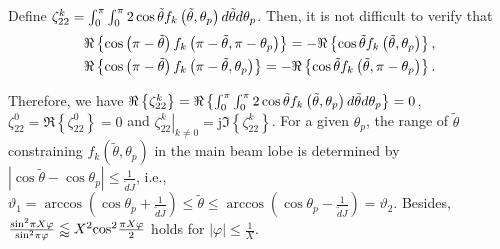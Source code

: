 \documentclass[12pt, draftclsnofoot, onecolumn]{IEEEtran}
\begin{document}
Define $\zeta _{22}^{k}=\int_{0}^{ \rm{\pi} }{\int_{0}^{ \rm{\pi} }{2\cos \tilde{\theta }{f_k}\left( \tilde{\theta },{{\theta }_{p}} \right)d\tilde{\theta }}d{{\theta }_{p}}}$. Then, it is not difficult to verify that
\begin{align}
  & \Re \left\{ \cos \left( { \rm{\pi} }-\tilde{\theta } \right){f_k}\left( { \rm{\pi} }-\tilde{\theta },{ \rm{\pi} }-{{\theta }_{p}} \right) \right\}=-\Re \left\{ \cos \tilde{\theta }{f_k}\left( \tilde{\theta },{{\theta }_{p}} \right) \right\}, \nonumber \\
 & \Re \left\{ \cos \left( { \rm{\pi} }-\tilde{\theta } \right){f_k}\left( { \rm{\pi} }-\tilde{\theta },{{\theta }_{p}} \right) \right\}=-\Re \left\{ \cos \tilde{\theta }{f_k}\left( \tilde{\theta },{ \rm{\pi} } -{{\theta }_{p}} \right) \right\}.
\end{align}

Therefore, we have $\Re \left\{ \zeta _{22}^{k} \right\}=\Re \left\{ \int_{0}^{ \rm{\pi} }{\int_{0}^{ \rm{\pi} }{2\cos \tilde{\theta }{f_k}\left( \tilde{\theta },{{\theta }_{p}} \right)d\tilde{\theta }}d{{\theta }_{p}}} \right\}=0$, $\zeta _{22}^{0}=\Re \left\{ \zeta _{22}^{0} \right\}=0$ and ${{\left. \zeta _{22}^{k} \right|}_{k\ne 0}}=\text{j}\Im \left\{ \zeta _{22}^{k} \right\}$.
For a given ${{\theta }_{p}}$, the range of $\tilde{\theta }$ constraining ${f_k}\left( \tilde{\theta },{{\theta }_{p}} \right)$ in the main beam lobe is determined by $\left| \cos \tilde{\theta }-\cos {{\theta }_{p}} \right|\le \frac{1}{\tilde{d} J}$, i.e.,
$\vartheta_{1} = \arccos \left( \cos {{\theta }_{p}}+\frac{1}{\tilde{d} J} \right)\le \tilde{\theta }\le \arccos \left( \cos {{\theta }_{p}}-\frac{1}{\tilde{d} J} \right) = \vartheta_{2} $.
Besides, $\frac{{{\sin }^{2}}{ \rm{\pi} }X\varphi }{{{\sin }^{2}}{ \rm{\pi} }\varphi }\lessapprox {{X}^{2}}{{\cos }^{2}}\frac{{ \rm{\pi} }X\varphi }{2}$ holds for $\left| \varphi  \right|\le \frac{1}{X}$.
\end{document}
